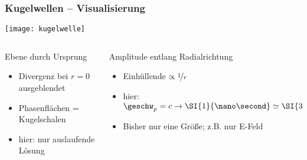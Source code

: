 \begin{frame}
  \frametitle{Kugelwellen -- Visualisierung}
  \centering\texttt{[image: kugelwelle]}
  \begin{columns}
    \begin{column}{0.5\textwidth}
      \centerline{Ebene durch Ursprung}
      \begin{itemize}
      \item Divergenz bei \(r=0\) ausgeblendet
      \item Phasenflächen = Kugelschalen
        \item hier: nur auslaufende Lösung
        \end{itemize}
    \end{column}
    \begin{column}{0.5\textwidth}
      \centerline{Amplitude entlang Radialrichtung}
      \begin{itemize}
      \item Einhüllende \(\propto \nicefrac{1}{r}\)
        \item hier: \(\geschw_p = c \to \SI{1}{\nano\second} \simeq \SI{33}{\centi\meter}\)
      \item Bisher nur eine Größe; z.B. nur E-Feld 
        \end{itemize}
      \end{column}
    \end{columns}
  \end{frame}
    
